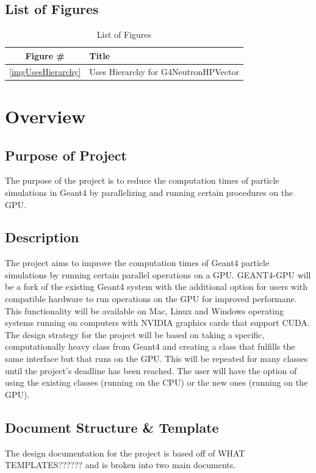 \documentclass[12pt]{article}
\begin{document}
\subsection{List of Figures}

\begin{table}[h]
\centering
\caption{List of Figures}\label{Table_Figures}
\begin{tabular}{cl}
\toprule
\bf Figure \# & \bf Title\\\midrule
\ref{imgUsesHierarchy} & Uses Hierarchy for G4NeutronHPVector\\
\bottomrule
\end{tabular}
\end{table}

\section{Overview}
\subsection{Purpose of Project}
The purpose of the project is to reduce the computation times of particle simulations in Geant4 by parallelizing and running certain procedures on the GPU.

\subsection{Description}
The project aims to improve the computation times of Geant4 particle simulations by running certain parallel operations on a GPU. GEANT4-GPU will be a fork of the existing Geant4 system with the additional option for users with compatible hardware to run operations on the GPU for improved performane. This functionality will be available on Mac, Linux and Windows operating systems running on computers with NVIDIA graphics cards that support CUDA.\\

The design strategy for the project will be based on taking a specific, computationally heavy class from Geant4 and creating a class that fulfills the same interface but that runs on the GPU. This will be repeated for many classes until the project's deadline has been reached. The user will have the option of using the existing classes (running on the CPU) or the new ones (running on the GPU).

\subsection{Document Structure \& Template}
The design documentation for the project is based off of WHAT TEMPLATES?????? and is broken into two main documents.\\
\end{document}

